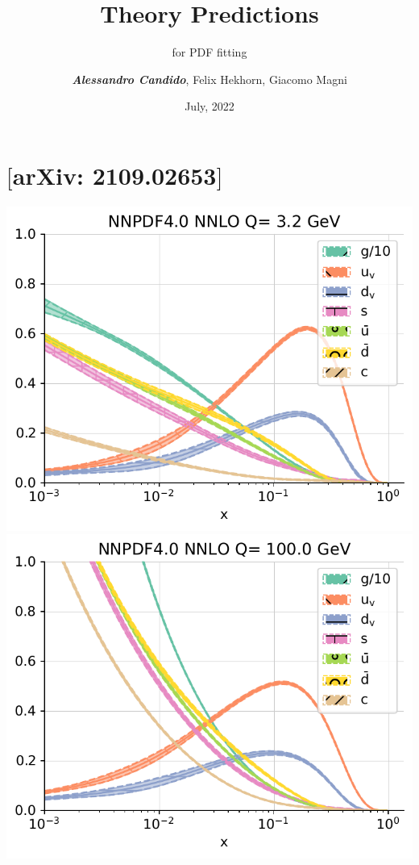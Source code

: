 \documentclass[9pt]{beamer}
\title{Theory Predictions}
\subtitle{for PDF fitting}
\date{July, 2022}
\author{\textit{\textbf{Alessandro Candido}}, Felix Hekhorn, Giacomo Magni}
\providecommand{\iRef}[1]{{\color{mLightGreen}\small $[$#1$]$}}
\begin{document}
\maketitle


\section{ \iRef{arXiv: 2109.02653}}

\begin{frame}{}
    \begin{center}
            \includegraphics[width=.49\linewidth]{pdfs_pdg_Qs0_plot_flavours}
            \includegraphics[width=.49\linewidth]{pdfs_pdg_Qs1_plot_flavours}
    \end{center}
\end{frame}
\end{document}
